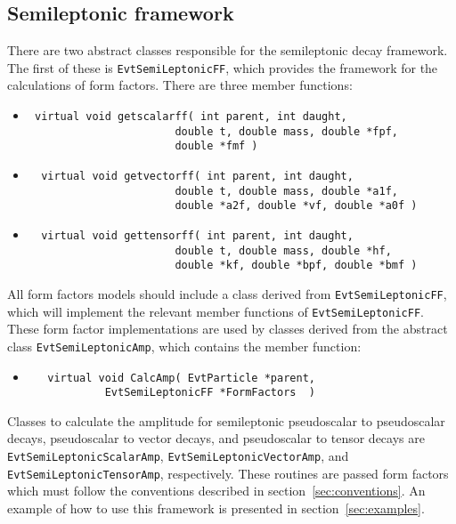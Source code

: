\subsection{Semileptonic framework}
\label{sec:framework}
There are two abstract classes responsible for the semileptonic decay
framework.  The first of these is 
{\tt EvtSemiLeptonicFF}, which 
provides the framework for the calculations of form factors.  There
are three member functions:
\begin{itemize}
\item \begin{verbatim} virtual void getscalarff( int parent, int daught,
                       double t, double mass, double *fpf,
                       double *fmf ) 
\end{verbatim}
\item \begin{verbatim}  virtual void getvectorff( int parent, int daught,
                       double t, double mass, double *a1f,
                       double *a2f, double *vf, double *a0f ) 
\end{verbatim}
\item \begin{verbatim}  virtual void gettensorff( int parent, int daught,
                       double t, double mass, double *hf,
                       double *kf, double *bpf, double *bmf ) 
\end{verbatim}
\end{itemize}
\noindent All form factors models should include a class 
derived from {\tt EvtSemiLeptonicFF},  which
will implement the relevant member functions of
{\tt EvtSemiLeptonicFF}.  \\

\noindent These form factor implementations are used by classes
derived from the abstract class {\tt EvtSemiLeptonicAmp},
which contains the member function:
\begin{itemize}
\item \begin{verbatim}   virtual void CalcAmp( EvtParticle *parent,
            EvtSemiLeptonicFF *FormFactors  ) 
\end{verbatim}
\end{itemize}
Classes to calculate the amplitude for semileptonic pseudoscalar to
pseudoscalar decays, pseudoscalar to vector decays, and 
pseudoscalar to tensor decays are 
{\tt EvtSemiLeptonicScalarAmp},
{\tt EvtSemiLeptonicVectorAmp}, and
{\tt EvtSemiLeptonicTensorAmp}, 
respectively.  These routines are passed form factors which
must follow the conventions described in section~\ref{sec:conventions}.
An example of how to use this framework is presented in 
section~\ref{sec:examples}.
 
